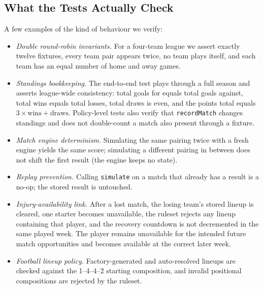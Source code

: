 \documentclass[11pt, a4paper]{article}
\newcommand{\code}[1]{\texttt{#1}}
\begin{document}
\subsection{What the Tests Actually Check}

A few examples of the kind of behaviour we verify:

\begin{itemize}
    \item \emph{Double round-robin invariants.} For a four-team league we
          assert exactly twelve fixtures, every team pair appears twice,
          no team plays itself, and each team has an equal number of home
          and away games.
    \item \emph{Standings bookkeeping.} The end-to-end test plays through
          a full season and asserts league-wide consistency: total goals
          for equals total goals against, total wins equals total losses,
          total draws is even, and the points total equals
          $3 \times \text{wins} + \text{draws}$. Policy-level tests also
          verify that \code{recordMatch} changes standings and does not
          double-count a match also present through a fixture.
    \item \emph{Match engine determinism.} Simulating the same pairing
          twice with a fresh engine yields the same score; simulating a
          different pairing in between does not shift the first result
          (the engine keeps no state).
    \item \emph{Replay prevention.} Calling \code{simulate} on a match
          that already has a result is a no-op; the stored result is
          untouched.
    \item \emph{Injury-availability link.} After a lost match, the losing
          team's stored lineup is cleared, one starter becomes unavailable,
          the ruleset rejects any lineup containing that player, and the
          recovery countdown is not decremented in the same played week.
          The player remains unavailable for the intended future match
          opportunities and becomes available at the correct later week.
    \item \emph{Football lineup policy.} Factory-generated and
          auto-resolved lineups are checked against the 1--4--4--2
          starting composition, and invalid positional compositions are
          rejected by the ruleset.
\end{itemize}

\end{document}
